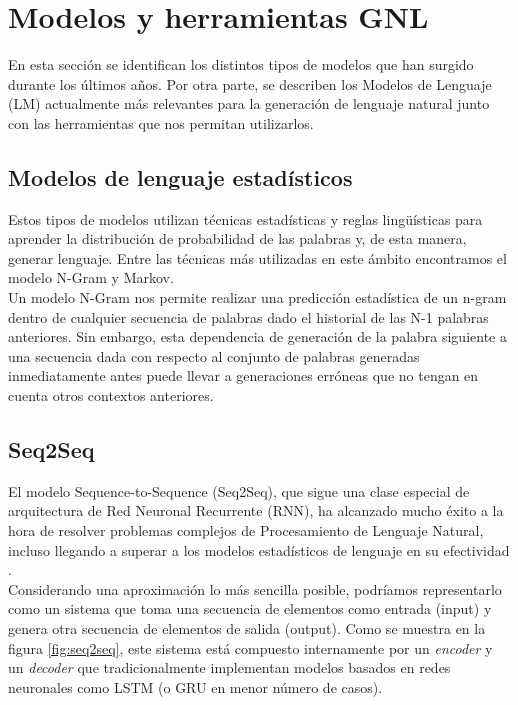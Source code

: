 \section{Modelos y herramientas GNL}
\label{sec:modelos}
En esta sección se identifican los distintos tipos de modelos que han surgido durante los últimos años. Por otra parte, se describen los Modelos de Lenguaje (LM) actualmente más relevantes para la generación de lenguaje natural junto con las herramientas que nos permitan utilizarlos.\\


\subsection{Modelos de lenguaje estadísticos}
Estos tipos de modelos utilizan técnicas estadísticas y reglas lingüísticas para aprender la distribución de probabilidad de las palabras y, de esta manera, generar lenguaje. Entre las técnicas más utilizadas en este ámbito encontramos el modelo N-Gram y Markov.\\

Un modelo N-Gram nos permite realizar una predicción estadística de un n-gram dentro de cualquier secuencia de palabras dado el historial de las N-1 palabras anteriores. Sin embargo, esta dependencia de generación de la palabra siguiente a una secuencia dada con respecto al conjunto de palabras generadas inmediatamente antes puede llevar a generaciones erróneas que no tengan en cuenta otros contextos anteriores.\\

\subsection{Seq2Seq}
El modelo Sequence-to-Sequence (Seq2Seq), que sigue una clase especial de arquitectura de Red Neuronal Recurrente (RNN), ha alcanzado mucho éxito a la hora de resolver problemas complejos de Procesamiento de Lenguaje Natural, incluso llegando a superar a los modelos estadísticos de lenguaje en su efectividad \citep{analytics_vidhya_2020}.\\

Considerando una aproximación lo más sencilla posible, podríamos representarlo como un sistema que toma una secuencia de elementos como entrada (input) y genera otra secuencia de elementos de salida (output). Como se muestra en la figura \ref{fig:seq2seq}, este sistema está compuesto internamente por un \textit{encoder} y un \textit{decoder} que tradicionalmente implementan modelos basados en redes neuronales como LSTM (o GRU en menor número de casos). \\

